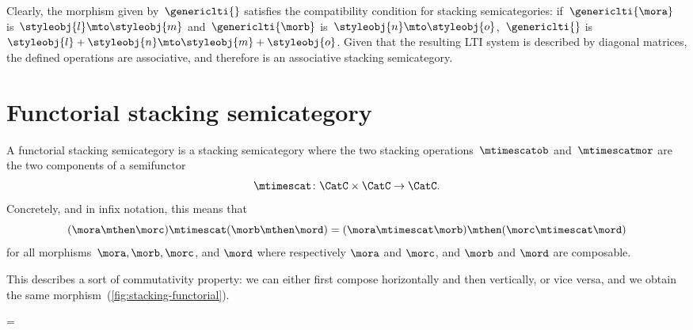 Clearly, the morphism given by~$\genericlti{}$ satisfies the compatibility condition for stacking semicategories:
if~$\genericlti{\mora}$ is~$\styleobj{l}\mto \styleobj{m}$ and~$\genericlti{\morb}$ is~$\styleobj{n}\mto \styleobj{o}$,~$\genericlti{}$ is~$\styleobj{l}+\styleobj{n}\mto \styleobj{m}+\styleobj{o}$.
Given that the resulting LTI system is described by diagonal matrices, the defined operations are associative, and therefore \LTI is an associative stacking semicategory.

\section{Functorial stacking semicategory}

\begin{ctdefinition}
    \label{def:functorial-stacking-semi-cat}
    A functorial stacking semicategory is a stacking semicategory where the two stacking operations~$\mtimescatob$ and~$\mtimescatmor$ are the two components of a semifunctor
    \begin{equation}
        \mtimescat\colon \CatC \times \CatC \to \CatC.
    \end{equation}
    Concretely, and in infix notation, this means that
    \begin{equation}
        (\mora \mthen \morc )
        \mtimescat (\morb \mthen \mord )
        =
        (\mora \mtimescat \morb )
        \mthen (\morc \mtimescat \mord )
    \end{equation}
    for all morphisms~$\mora, \morb, \morc$, and $\mord$ where respectively $\mora$ and $\morc$, and $\morb$ and $\mord$ are composable.
\end{ctdefinition}

%
This describes a sort of commutativity property: we can either first compose horizontally and then vertically, or vice versa, and we obtain the same morphism~(\cref{fig:stacking-functorial}).

\begin{figure*}[h]
    \centering
    =
    \caption{Commutation of stacking and composition in a functorial stacking semicategory. }
    \label{fig:stacking-functorial}
\end{figure*}

